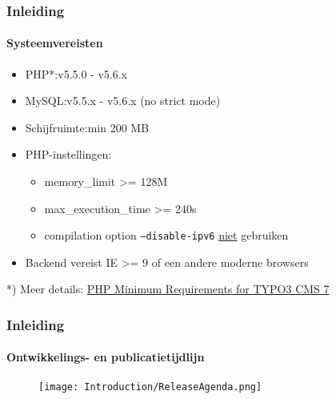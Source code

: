 \begin{frame}[fragile]
	\frametitle{Inleiding}
	\framesubtitle{Systeemvereisten}

	\begin{itemize}
		\item PHP*:\tabto{2.2cm}v5.5.0 - v5.6.x
		\item MySQL:\tabto{2.2cm}v5.5.x - v5.6.x (no strict mode)
		\item Schijfruimte:\tabto{2.2cm}min 200 MB
		\item PHP-instellingen:

			\begin{itemize}
				\item memory\_limit >= 128M
				\item max\_execution\_time >= 240s
				\item compilation option \texttt{--disable-ipv6} \underline{niet} gebruiken
			\end{itemize}

		\item Backend vereist IE >= 9 of een andere moderne browsers

	\end{itemize}

	\vspace{1cm}
	*) Meer details: \href{http://typo3.org/news/article/php-minimum-requirements-for-typo3-cms-7/}{PHP Minimum Requirements for TYPO3 CMS 7}

\end{frame}

\begin{frame}[fragile]
	\frametitle{Inleiding}
	\framesubtitle{Ontwikkelings- en publicatietijdlijn}

	\begin{figure}
		\texttt{[image: Introduction/ReleaseAgenda.png]}
	\end{figure}

\end{frame}

